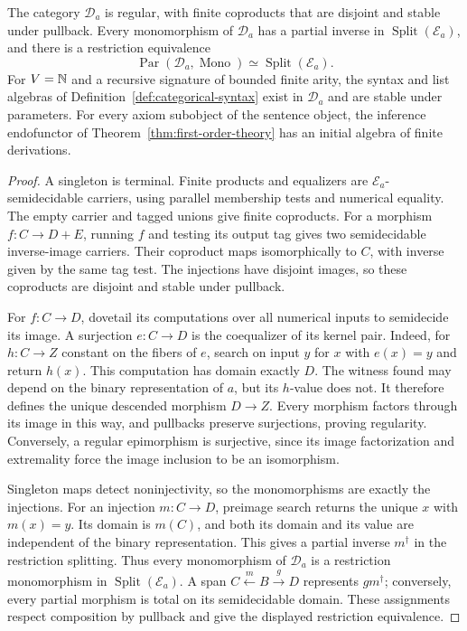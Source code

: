 \begin{proposition}\label{prop:miller-theory-realization}
The category $\mathcal D_a$ is regular, with finite coproducts that
are disjoint and stable under pullback. Every monomorphism of
$\mathcal D_a$ has a partial inverse in
$\operatorname{Split}(\mathcal E_a)$, and there is a restriction equivalence
\[
 \operatorname{Par}(\mathcal D_a,\operatorname{Mono})
       \simeq\operatorname{Split}(\mathcal E_a).
\]
For $V=\mathbb N$ and a recursive signature of bounded finite arity, the
syntax and list algebras of Definition~\ref{def:categorical-syntax}
exist in $\mathcal D_a$ and are stable under parameters.
For every axiom subobject of the sentence object, the inference
endofunctor of Theorem~\ref{thm:first-order-theory} has an initial
algebra of finite derivations.
\end{proposition}
\begin{proof}
A singleton is terminal. Finite products and equalizers are
$\mathcal E_a$-semidecidable carriers, using parallel membership
tests and numerical equality. The empty carrier and tagged unions
give finite coproducts.
For a morphism $f:C\to D+E$, running $f$ and testing its output tag
gives two semidecidable inverse-image carriers. Their coproduct
maps isomorphically to $C$, with inverse given by the same tag test.
The injections have disjoint images, so these coproducts are disjoint
and stable under pullback.

For $f:C\to D$, dovetail its computations over all numerical inputs
to semidecide its image. A surjection $e:C\to D$ is the coequalizer
of its kernel pair. Indeed, for $h:C\to Z$ constant on the fibers
of $e$, search on input $y$ for $x$ with $e(x)=y$ and return $h(x)$.
This computation has domain exactly $D$. The witness found may
depend on the binary representation of $a$, but its $h$-value does
not. It therefore defines the unique descended morphism $D\to Z$.
Every morphism factors through its image in this way, and pullbacks
preserve surjections, proving regularity. Conversely, a regular
epimorphism is surjective, since its image factorization and
extremality force the image inclusion to be an isomorphism.

Singleton maps detect noninjectivity, so the monomorphisms are
exactly the injections. For an injection $m:C\to D$, preimage
search returns the unique $x$ with $m(x)=y$. Its domain is $m(C)$,
and both its domain and its value are independent of the binary
representation. This gives a partial inverse $m^\dagger$ in the
restriction splitting. Thus every monomorphism of $\mathcal D_a$
is a restriction monomorphism in $\operatorname{Split}(\mathcal E_a)$. A span
$C\xleftarrow{m}B\xrightarrow{g}D$ represents $gm^\dagger$;
conversely, every partial morphism is total on its semidecidable
domain. These assignments respect composition by pullback and give
the displayed restriction equivalence.


\end{proof}

